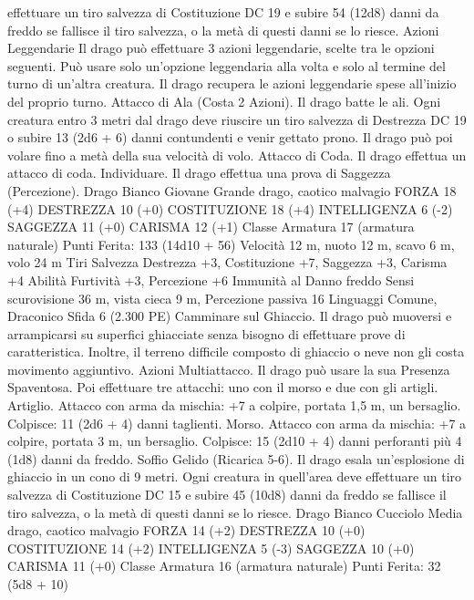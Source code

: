 \begin{multicols}{2}
effettuare un tiro salvezza di Costituzione DC 19 e subire 54
(12d8) danni da freddo se fallisce il tiro salvezza, o la metà di
questi danni se lo riesce.
Azioni Leggendarie
Il drago può effettuare 3 azioni leggendarie, scelte tra le opzioni
seguenti. Può usare solo un’opzione leggendaria alla volta e solo
al termine del turno di un’altra creatura. Il drago recupera le
azioni leggendarie spese all’inizio del proprio turno.
Attacco di Ala (Costa 2 Azioni). Il drago batte le ali. Ogni creatura
entro 3 metri dal drago deve riuscire un tiro salvezza di Destrezza
DC 19 o subire 13 (2d6 + 6) danni contundenti e venir gettato prono.
Il drago può poi volare fino a metà della sua velocità di volo.
Attacco di Coda. Il drago effettua un attacco di coda.
Individuare. Il drago effettua una prova di Saggezza (Percezione).
Drago Bianco Giovane
Grande drago, caotico malvagio
FORZA 18 (+4)
DESTREZZA 10 (+0)
COSTITUZIONE 18 (+4)
INTELLIGENZA 6 (-2)
SAGGEZZA 11 (+0)
CARISMA 12 (+1)
Classe Armatura 17 (armatura naturale)
\hspace*{0pt}\hfill{Punti Ferita}: 133 (14d10 + 56)
Velocità 12 m, nuoto 12 m, scavo 6 m, volo 24 m
Tiri Salvezza Destrezza +3, Costituzione +7, Saggezza +3,
Carisma +4
Abilità Furtività +3, Percezione +6
Immunità al Danno freddo
Sensi scurovisione 36 m, vista cieca 9 m, Percezione passiva 16
Linguaggi Comune, Draconico
Sfida 6 (2.300 PE)
Camminare sul Ghiaccio. Il drago può muoversi e arrampicarsi su
superfici ghiacciate senza bisogno di effettuare prove di
caratteristica. Inoltre, il terreno difficile composto di ghiaccio o neve
non gli costa movimento aggiuntivo.
Azioni
Multiattacco. Il drago può usare la sua Presenza Spaventosa. Poi
effettuare tre attacchi: uno con il morso e due con gli artigli.
Artiglio. Attacco con arma da mischia: +7 a colpire, portata 1,5
m, un bersaglio.
Colpisce: 11 (2d6 + 4) danni taglienti.
Morso. Attacco con arma da mischia: +7 a colpire, portata 3 m,
un bersaglio.
Colpisce: 15 (2d10 + 4) danni perforanti più 4 (1d8) danni da freddo.
Soffio Gelido (Ricarica 5-6). Il drago esala un’esplosione di ghiaccio
in un cono di 9 metri. Ogni creatura in quell’area deve effettuare un tiro
salvezza di Costituzione DC 15 e subire 45 (10d8) danni da freddo se
fallisce il tiro salvezza, o la metà di questi danni se lo riesce.
Drago Bianco Cucciolo
Media drago, caotico malvagio
FORZA 14 (+2)
DESTREZZA 10 (+0)
COSTITUZIONE 14 (+2)
INTELLIGENZA 5 (-3)
SAGGEZZA 10 (+0)
CARISMA 11 (+0)
Classe Armatura 16 (armatura naturale)
\hspace*{0pt}\hfill{Punti Ferita}: 32 (5d8 + 10)

\end{multicols}
